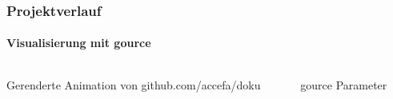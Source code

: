\begin{frame}
	\frametitle{Projektverlauf\hfill{}\footnotesize \group}
	\framesubtitle{Visualisierung mit gource}
	\begin{columns}
		\begin{column}{0.5\textwidth}
			\begin{block}{Gerenderte Animation von github.com/accefa/doku}
			\end{block}
		\end{column}
		\begin{column}{0.5\textwidth}
			\begin{exampleblock}{gource Parameter}
				
			\end{exampleblock}
		\end{column}
	\end{columns}
\end{frame}

